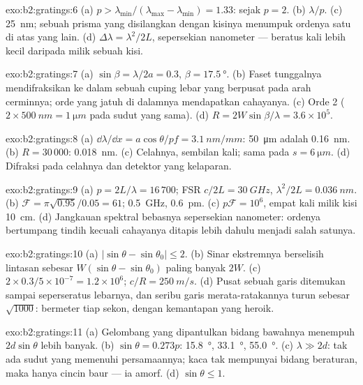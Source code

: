 \begin{solution}{exo:b2:gratings:6}
(a) $p > \lambda_{\min}/(\lambda_{\max} - \lambda_{\min}) = 1.33$: sejak $p = 2$. (b) $\lambda/p$. (c)
\qty{25}{nm}; sebuah prisma yang disilangkan dengan kisinya menumpuk ordenya satu di atas
yang lain. (d) $\Delta\lambda = \lambda^2/2L$, sepersekian nanometer --- beratus
kali lebih kecil daripada milik sebuah kisi.
\end{solution}

\begin{solution}{exo:b2:gratings:7}
(a) $\sin\beta = \lambda/2a = 0.3$, $\beta = \qty{17.5}{\degree}$. (b) Faset tunggalnya mendifraksikan
ke dalam sebuah cuping lebar yang berpusat pada arah cerminnya; orde yang
jatuh di dalamnya mendapatkan cahayanya. (c) Orde 2 ($2 \times \qty{500}{nm} = \qty{1}{\micro m}$ pada
sudut yang sama). (d) $R = 2W\sin\beta/\lambda = 3.6 \times 10^5$.
\end{solution}

\begin{solution}{exo:b2:gratings:8}
(a) $\dd\lambda/\dd x = a\cos\theta/pf = \qty{3.1}{nm/mm}$: \qty{50}{\micro m} adalah \qty{0.16}{nm}. (b)
$R = 30\,000$: \qty{0.018}{nm}. (c) Celahnya, sembilan kali; sama pada $s = \qty{6}{\micro m}$.
(d) Difraksi pada celahnya dan detektor yang kelaparan.
\end{solution}

\begin{solution}{exo:b2:gratings:9}
(a) $p = 2L/\lambda = 16\,700$; FSR $c/2L = \qty{30}{GHz}$, $\lambda^2/2L = \qty{0.036}{nm}$. (b) $\mathcal F
= \pi\sqrt{0.95}/0.05 = 61$; \qty{0.5}{GHz}, \qty{0.6}{pm}. (c) $p\mathcal F = 10^6$, empat
kali milik kisi \qty{10}{cm}. (d) Jangkauan spektral bebasnya sepersekian
nanometer: ordenya bertumpang tindih kecuali cahayanya ditapis lebih dahulu
menjadi salah satunya.
\end{solution}

\begin{solution}{exo:b2:gratings:10}
(a) $|\sin\theta - \sin\theta_0| \le 2$. (b) Sinar ekstremnya berselisih lintasan sebesar
$W(\sin\theta - \sin\theta_0)$ paling banyak $2W$. (c) $2 \times 0.3/5 \times 10^{-7} = 1.2 \times 10^6$; $c/R
= \qty{250}{m/s}$. (d) Pusat sebuah garis ditemukan sampai seperseratus
lebarnya, dan seribu garis merata-ratakannya turun sebesar $\sqrt{1000}$: bermeter tiap
sekon, dengan kemantapan yang heroik.
\end{solution}

\begin{solution}{exo:b2:gratings:11}
(a) Gelombang yang dipantulkan bidang bawahnya menempuh $2d\sin\theta$ lebih banyak.
(b) $\sin\theta = 0.273p$: \qty{15.8}{\degree}, \qty{33.1}{\degree}, \qty{55.0}{\degree}. (c) $\lambda \gg 2d$:
tak ada sudut yang memenuhi persamaannya; kaca tak mempunyai bidang beraturan, maka
hanya cincin baur --- ia amorf. (d) $\sin\theta \le 1$.
\end{solution}

